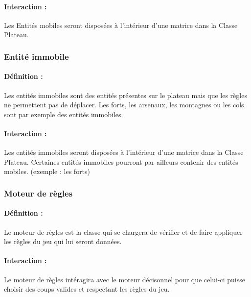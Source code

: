 \documentclass[12pt]{article}
\begin{document}
				\paragraph{Interaction :}

				Les Entités mobiles seront disposées à l'intérieur d'une matrice dans la Classe Plateau.

			\subsubsection{Entité immobile}

				\paragraph{Définition :}

				Les entités immobiles sont des entités présentes sur le plateau mais que les règles ne permettent pas de déplacer. Les forts, les arsenaux, les montagnes ou les cols sont par exemple des entités immobiles.

				\paragraph{Interaction :}

				Les entités immobiles seront disposées à l'intérieur d'une matrice dans la Classe Plateau. Certaines entités immobiles pourront par ailleurs contenir des entités mobiles. (exemple : les forts)

			\subsubsection{Moteur de règles}

				\paragraph{Définition :}

				Le moteur de règles est la classe qui se chargera de vérifier et de faire appliquer les règles du jeu qui lui seront données.

				\paragraph{Interaction :}

				Le moteur de règles intéragira avec le moteur décisonnel pour que celui-ci puisse choisir des coups valides et respectant les règles du jeu.
\end{document}
